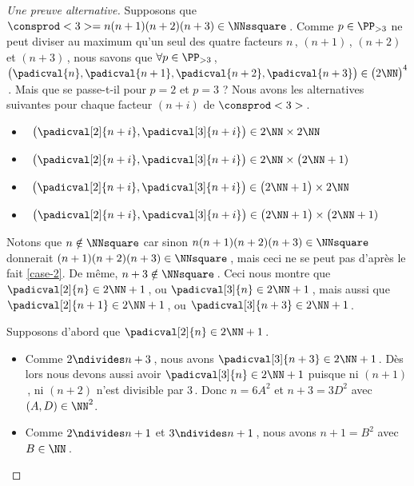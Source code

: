 \begin{proof}[Une preuve alternative]
	Supposons que $\consprod<3> = n(n+1)(n+2)(n+3) \in \NNssquare$\,.
    Comme $p \in \PP_{>3}$ ne peut diviser au maximum qu'un seul des quatre facteurs $n$\,, $(n+1)$\,, $(n+2)$ et $(n+3)$\,, nous savons que 
    $\forall p \in \PP_{>3}$\,, 
    $\big( \padicval{n} , \padicval{n + 1} , \padicval{n + 2} , \padicval{n + 3} \big) \in \big( 2 \NN \big)^4$\,.
    Mais que se passe-t-il pour $p = 2$ et $p = 3$ ?
    Nous avons les alternatives suivantes pour chaque facteur $(n+i)$ de $\consprod<3>$\,.
    \begin{itemize}
    	\item {}\,
		$\big( \padicval[2]{n + i} , \padicval[3]{n + i} \big) \in 2 \NN \times 2 \NN$

    	\item {}\,
		$\big( \padicval[2]{n + i} , \padicval[3]{n + i} \big) \in 2 \NN \times \big( 2 \NN + 1)$

    	\item {}\,
		$\big( \padicval[2]{n + i} , \padicval[3]{n + i} \big) \in \big( 2 \NN + 1 \big) \times 2 \NN$

    	\item {}\,
		$\big( \padicval[2]{n + i} , \padicval[3]{n + i} \big) \in \big( 2 \NN + 1 \big) \times \big( 2 \NN + 1)$
    \end{itemize}
    
    \medskip
    
    Notons que $n \notin \NNsquare$ car sinon $n(n+1)(n+2)(n+3) \in \NNsquare$ donnerait $(n+1)(n+2)(n+3) \in \NNsquare$\,, mais ceci ne se peut pas d'après le fait \ref{case-2}.
    De même, $n+3 \notin \NNsquare$\,.
    Ceci nous montre que $\padicval[2]{n} \in 2 \NN + 1$\,, ou $\padicval[3]{n} \in 2 \NN + 1$\,, mais aussi que $\padicval[2]{n+1} \in 2 \NN + 1$\,, ou $\padicval[3]{n+3} \in 2 \NN + 1$\,.
	
	\medskip
	
	Supposons d'abord que $\padicval[2]{n} \in 2 \NN + 1$\,.
	\begin{itemize}
		\item Comme $2 \ndivides n+3$\,, nous avons $\padicval[3]{n+3} \in 2 \NN + 1$\,.
		Dès lors nous devons aussi avoir $\padicval[3]{n} \in 2 \NN + 1$ puisque ni $(n+1)$\,, ni $(n+2)$ n'est divisible par $3$\,.
		Donc $n = 6 A^2$ et $n+3 = 3 D^2$ avec $(A, D) \in \NN^2$.

		\item Comme $2 \ndivides n+1$ et $3 \ndivides n+1$\,, nous avons $n+1 = B^2$ avec $B \in \NN$\,.


\end{itemize}
\end{proof}
